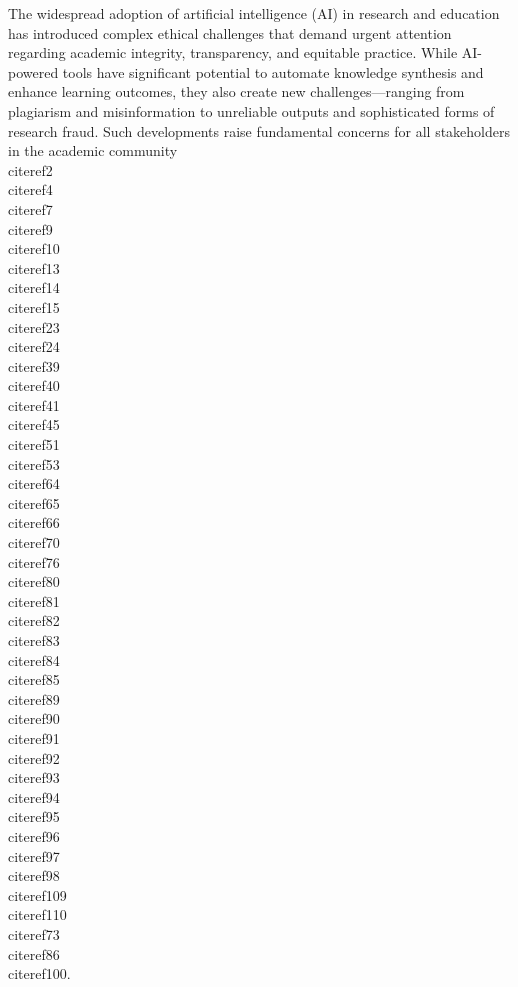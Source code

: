 \documentclass[11pt]{article}
\begin{document}
The widespread adoption of artificial intelligence (AI) in research and education has introduced complex ethical challenges that demand urgent attention regarding academic integrity, transparency, and equitable practice. While AI-powered tools have significant potential to automate knowledge synthesis and enhance learning outcomes, they also create new challenges—ranging from plagiarism and misinformation to unreliable outputs and sophisticated forms of research fraud. Such developments raise fundamental concerns for all stakeholders in the academic community \\cite{ref2}\\cite{ref4}\\cite{ref7}\\cite{ref9}\\cite{ref10}\\cite{ref13}\\cite{ref14}\\cite{ref15}\\cite{ref23}\\cite{ref24}\\cite{ref39}\\cite{ref40}\\cite{ref41}\\cite{ref45}\\cite{ref51}\\cite{ref53}\\cite{ref64}\\cite{ref65}\\cite{ref66}\\cite{ref70}\\cite{ref76}\\cite{ref80}\\cite{ref81}\\cite{ref82}\\cite{ref83}\\cite{ref84}\\cite{ref85}\\cite{ref89}\\cite{ref90}\\cite{ref91}\\cite{ref92}\\cite{ref93}\\cite{ref94}\\cite{ref95}\\cite{ref96}\\cite{ref97}\\cite{ref98}\\cite{ref109}\\cite{ref110}\\cite{ref73}\\cite{ref86}\\cite{ref100}.
\end{document}
